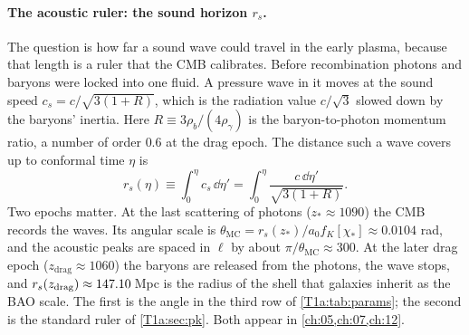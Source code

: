 \paragraph{The acoustic ruler: the sound horizon $r_s$.}
The question is how far a sound wave could travel in the early plasma, because that length is a ruler that the CMB calibrates. Before recombination photons and baryons were locked into one fluid. A pressure wave in it moves at the sound speed $c_s=c/\sqrt{3(1+R)}$, which is the radiation value $c/\sqrt3$ slowed down by the baryons' inertia. Here $R\equiv3\rho_b/(4\rho_\gamma)$ is the baryon-to-photon momentum ratio, a number of order $0.6$ at the drag epoch. The distance such a wave covers up to conformal time $\eta$ is
\begin{equation*}
r_s(\eta)\equiv\int_0^\eta c_s\,\dd\eta'=\int_0^\eta\frac{c\,\dd\eta'}{\sqrt{3(1+R)}} .
\end{equation*}
Two epochs matter. At the last scattering of photons ($z_*\approx1090$) the CMB records the waves. Its angular scale is $\theta_{\mathrm{MC}}=r_s(z_*)/a_0f_K[\chi_*]\approx0.0104$ rad, and the acoustic peaks are spaced in $\ell$ by about $\pi/\theta_{\mathrm{MC}}\approx300$. At the later drag epoch ($z_{\mathrm{drag}}\approx1060$) the baryons are released from the photons, the wave stops, and $r_s(z_{\mathrm{drag}})\approx147.10$\,Mpc is the radius of the shell that galaxies inherit as the BAO scale. The first is the angle in the third row of \cref{T1a:tab:params}; the second is the standard ruler of \cref{T1a:sec:pk}. Both appear in \cref{ch:05,ch:07,ch:12}.

